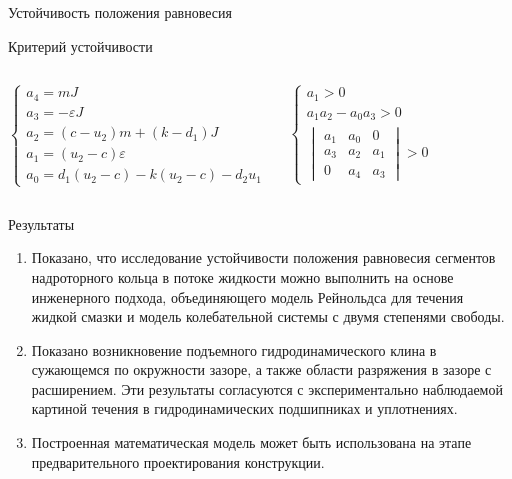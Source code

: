 \documentclass[ignoreonframetext,unicode]{beamer}
\begin{document}
\begin{frame}{Устойчивость положения равновесия}
\begin{block}{Критерий устойчивости}
\begin{columns}
	\begin{equation*} 
		\begin{cases}
			a_4 = m J \\
			a_3 = - \varepsilon J \\
			a_2 = \left(c - u_2 \right) m + \left(k - d_1 \right)J \\
			a_1 = \left(u_2 - c\right) \varepsilon \\
			a_0 = d_1 \left( u_2 - c \right) - k \left( u_2 - c \right) - d_2 u_1
		\end{cases}
	\end{equation*}

		\begin{equation*} 
		\begin{cases}
			a_1 >  0 \\
			a_1 a_2 - a_0 a_3 > 0 \\
			\begin{vmatrix*}
				a_1 & a_0 & 0 \\
				a_3 & a_2 & a_1 \\
				0 & a_4 & a_3 
			\end{vmatrix*} > 0
		\end{cases}
	\end{equation*}
\end{columns}
\end{block}


	
\end{frame}

\begin{frame}{Результаты}
	\begin{block}{}
	\begin{enumerate}	
		\item Показано, что исследование устойчивости положения равновесия сегментов надроторного кольца в потоке жидкости можно выполнить на основе инженерного подхода, объединяющего модель Рейнольдса для течения жидкой смазки и модель колебательной системы с двумя степенями свободы.
		\item Показано возникновение подъемного гидродинамического клина в сужающемся по окружности зазоре, а также области разряжения в зазоре с расширением. Эти результаты согласуются с экспериментально наблюдаемой картиной течения в гидродинамических подшипниках и уплотнениях.
		\item Построенная математическая модель может быть использована на этапе предварительного проектирования конструкции.
	\end{enumerate}
	\end{block}	

\end{frame}	
\end{document}
